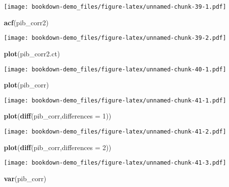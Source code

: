 \documentclass[]{book}
\newenvironment{Shaded}{\begin{snugshade}}{\end{snugshade}}
\newcommand{\KeywordTok}[1]{\textcolor[rgb]{0.13,0.29,0.53}{\textbf{#1}}}
\newcommand{\DataTypeTok}[1]{\textcolor[rgb]{0.13,0.29,0.53}{#1}}
\newcommand{\DecValTok}[1]{\textcolor[rgb]{0.00,0.00,0.81}{#1}}
\newcommand{\NormalTok}[1]{#1}
\theoremstyle{definition}
\theoremstyle{definition}
\theoremstyle{definition}
\theoremstyle{remark}
\begin{document}
\texttt{[image: bookdown-demo\_files/figure-latex/unnamed-chunk-39-1.pdf]}

\begin{Shaded}
\begin{Highlighting}[]
\KeywordTok{acf}\NormalTok{(pib_corr2)}
\end{Highlighting}
\end{Shaded}

\texttt{[image: bookdown-demo\_files/figure-latex/unnamed-chunk-39-2.pdf]}

\begin{Shaded}
\begin{Highlighting}[]
\KeywordTok{plot}\NormalTok{(pib_corr2.ct)}
\end{Highlighting}
\end{Shaded}

\texttt{[image: bookdown-demo\_files/figure-latex/unnamed-chunk-40-1.pdf]}

\begin{Shaded}
\begin{Highlighting}[]
\KeywordTok{plot}\NormalTok{(pib_corr)}
\end{Highlighting}
\end{Shaded}

\texttt{[image: bookdown-demo\_files/figure-latex/unnamed-chunk-41-1.pdf]}

\begin{Shaded}
\begin{Highlighting}[]
\KeywordTok{plot}\NormalTok{(}\KeywordTok{diff}\NormalTok{(pib_corr,}\DataTypeTok{differences =} \DecValTok{1}\NormalTok{))}
\end{Highlighting}
\end{Shaded}

\texttt{[image: bookdown-demo\_files/figure-latex/unnamed-chunk-41-2.pdf]}

\begin{Shaded}
\begin{Highlighting}[]
\KeywordTok{plot}\NormalTok{(}\KeywordTok{diff}\NormalTok{(pib_corr,}\DataTypeTok{differences =} \DecValTok{2}\NormalTok{))}
\end{Highlighting}
\end{Shaded}

\texttt{[image: bookdown-demo\_files/figure-latex/unnamed-chunk-41-3.pdf]}

\begin{Shaded}
\begin{Highlighting}[]
\KeywordTok{var}\NormalTok{(pib_corr)}
\end{Highlighting}
\end{Shaded}
\end{document}
